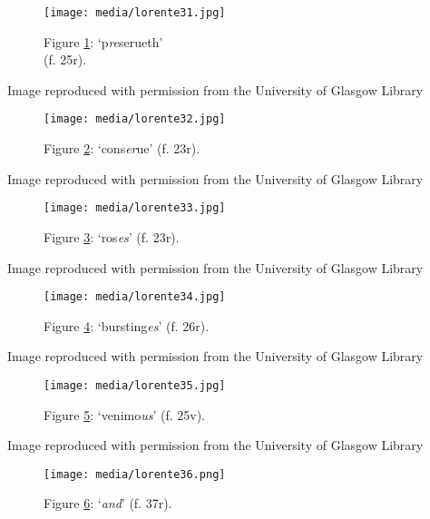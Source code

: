 \documentclass{article}
\begin{document}
 
  \begin{figure}
    \texttt{[image: media/lorente31.jpg]}
    \caption{Figure \ref{fig:lorente31}: `p\emph{re}serueth' \\ (f. 25r).}
    \label{fig:lorente31}
\end{figure}


 Image reproduced with permission from the University of Glasgow Library 


 
\begin{figure}[H]
  \centering
    \texttt{[image: media/lorente32.jpg]}
    \caption{Figure \ref{fig:lorente32}: `cons\emph{er}ue' (f. 23r).\\}
    \label{fig:lorente32}
  \end{figure}


 Image reproduced with permission from the University of Glasgow Library 


 
  \begin{figure}
    \texttt{[image: media/lorente33.jpg]}
    \caption{Figure \ref{fig:lorente33}: `ros\emph{es}' (f. 23r).\\}
    \label{fig:lorente33}
  \end{figure}


 Image reproduced with permission from the University of Glasgow Library 


 
  \begin{figure}
    \texttt{[image: media/lorente34.jpg]}
    \caption{Figure \ref{fig:lorente34}: `bursting\emph{es}' (f. 26r).}
    \label{fig:lorente34}
  \end{figure}


 Image reproduced with permission from the University of Glasgow Library 


 
  \begin{figure}
    \texttt{[image: media/lorente35.jpg]}
    \caption{Figure \ref{fig:lorente35}: `venimo\emph{us}' (f.
25v).}
    \label{fig:lorente35}
\end{figure}


 Image reproduced with permission from the University of Glasgow Library 


 
\begin{figure}[H]
  \centering
    \texttt{[image: media/lorente36.png]}
    \caption{Figure \ref{fig:lorente36}: `\emph{and}' (f. 37r).\\}
    \label{fig:lorente36}
  \end{figure}
\end{document}
